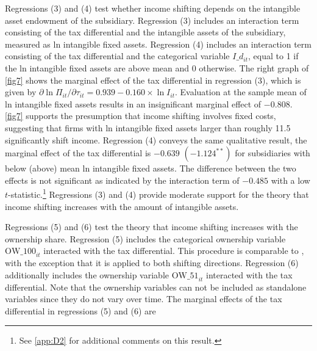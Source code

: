 \documentclass[10pt,twocolumn,oneside,cmyk]{article}
\begin{document}
Regressions (3) and (4) test whether income shifting depends on the intangible asset endowment of the subsidiary. Regression (3) includes an interaction term consisting of the tax differential and the intangible assets of the subsidiary, measured as ln intangible fixed assets. Regression (4) includes an interaction term consisting of the tax differential and the categorical variable $I\_d_{it}$, equal to 1 if the ln intangible fixed assets are above mean and 0 otherwise. The right graph of \cref{fig7} shows the marginal effect of the tax differential in regression (3), which is given by $\partial \ln \Pi_{it}/\partial\tau_{it}=0.939-0.160\times \ln I_{it}$. Evaluation at the sample mean of ln intangible fixed assets results in an insignificant marginal effect of $-0.808$. \cref{fig7} supports the presumption that income shifting involves fixed costs, suggesting that firms with ln intangible fixed assets larger than roughly 11.5 significantly shift income. Regression (4) conveys the same qualitative result, the marginal effect of the tax differential is $-0.639$ $(-1.124^{**})$ for subsidiaries with below (above) mean ln intangible fixed assets. The difference between the two effects is not significant as indicated by the interaction term of $-0.485$ with a low $t$-statistic.\footnote{See \cref{app:D2} for additional comments on this result.} Regressions (3) and (4) provide moderate support for the theory that income shifting increases with the amount of intangible assets.

Regressions (5) and (6) test the theory that income shifting increases with the ownership share. Regression (5) includes the categorical ownership variable $\text{OW\_100}_{it}$ interacted with the tax differential. This procedure is comparable to \textcite[285]{weichenrieder_profit_2009}, with the exception that it is applied to both shifting directions. Regression (6) additionally includes the ownership variable $\text{OW\_51}_{it}$ interacted with the tax differential. Note that the ownership variables can not be included as standalone variables since they do not vary over time. The marginal effects of the tax differential in regressions (5) and (6) are
\end{document}
